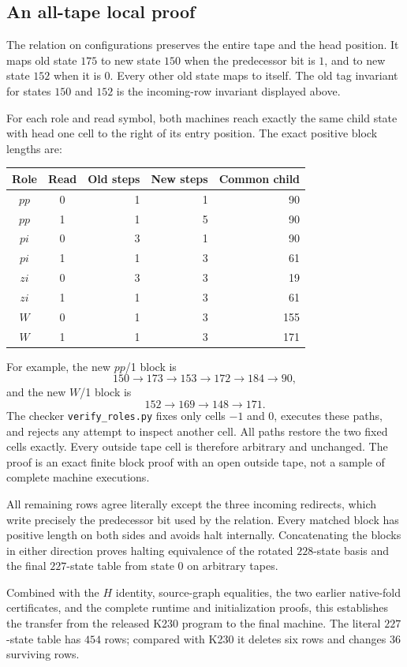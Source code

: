 \subsection{An all-tape local proof}

The relation on configurations preserves the entire tape and the head
position.  It maps old state $175$ to new state $150$ when the
predecessor bit is $1$, and to new state $152$ when it is $0$.
Every other old state maps to itself.  The old tag invariant for states
$150$ and $152$ is the incoming-row invariant displayed above.

For each role and read symbol, both machines reach exactly the same
child state with head one cell to the right of its entry position.
The exact positive block lengths are:
\begin{center}
\begin{tabular}{c c r r r}
Role & Read & Old steps & New steps & Common child\\
\hline
$pp$ & 0 & 1 & 1 & 90\\
$pp$ & 1 & 1 & 5 & 90\\
$pi$ & 0 & 3 & 1 & 90\\
$pi$ & 1 & 1 & 3 & 61\\
$zi$ & 0 & 3 & 3 & 19\\
$zi$ & 1 & 1 & 3 & 61\\
$W$  & 0 & 1 & 3 & 155\\
$W$  & 1 & 1 & 3 & 171
\end{tabular}
\end{center}

For example, the new $pp$/1 block is
\[
150\longrightarrow173\longrightarrow153\longrightarrow172
\longrightarrow184\longrightarrow90,
\]
and the new $W$/1 block is
\[
152\longrightarrow169\longrightarrow148\longrightarrow171.
\]
The checker \texttt{verify\_roles.py} fixes only cells $-1$ and $0$,
executes these paths, and rejects any attempt to inspect another cell.
All paths restore the two fixed cells exactly.  Every outside tape cell
is therefore arbitrary and unchanged.  The proof is an exact finite
block proof with an open outside tape, not a sample of complete machine
executions.

All remaining rows agree literally except the three incoming redirects,
which write precisely the predecessor bit used by the relation.
Every matched block has positive length on both sides and avoids halt
internally.  Concatenating the blocks in either direction proves
halting equivalence of the rotated $228$-state basis and the final
$227$-state table from state $0$ on arbitrary tapes.

Combined with the $H$ identity, source-graph equalities, the two earlier
native-fold certificates, and the complete runtime and initialization
proofs, this establishes the transfer from the released K230 program to
the final machine.  The literal $227$-state table has $454$ rows; compared
with K230 it deletes six rows and changes $36$ surviving rows.
